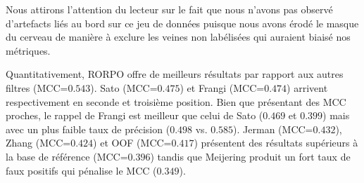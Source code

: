 Nous attirons l'attention du lecteur sur le fait que nous n'avons pas observé d'artefacts liés au bord sur ce jeu de données puisque nous avons érodé le masque du cerveau de manière à exclure les veines non labélisées qui auraient biaisé nos métriques. 

Quantitativement, RORPO offre de meilleurs résultats par rapport aux autres filtres (MCC=$0.543$). Sato (MCC=$0.475$) et Frangi (MCC=$0.474$) arrivent respectivement en seconde et troisième position. Bien que présentant des MCC proches, le rappel de Frangi est meilleur que celui de Sato  ($0.469$ et $0.399$) mais avec un plus faible taux de précision ($0.498$ vs. $0.585$). Jerman (MCC=$0.432$), Zhang (MCC=$0.424$) et OOF (MCC=$0.417$) présentent des résultats supérieurs à la base de référence (MCC=$0.396$) tandis que Meijering produit un fort taux de faux positifs qui pénalise le MCC ($0.349$).

